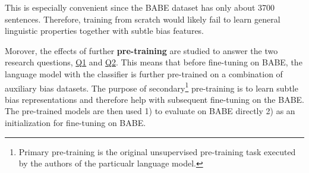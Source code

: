 This is especially convenient since the BABE dataset has only about 3700 sentences. Therefore, training from scratch would likely fail to learn general linguistic properties together with subtle bias features.







Morover, the effects of further \textbf{pre-training} are studied to answer the two research questions, \hyperref[Q1]{Q1} and \hyperref[Q2]{Q2}. This means that before fine-tuning on BABE, the language model with the classifier is further pre-trained on a combination of auxiliary bias datasets. The purpose of secondary\footnote{Primary pre-training is the original unsupervised pre-training task executed by the authors of the particualr language model.} pre-training is to learn subtle bias representations and therefore help with subsequent fine-tuning on the BABE. The pre-trained models are then used 1) to evaluate on BABE directly 2) as an initialization for fine-tuning on BABE.